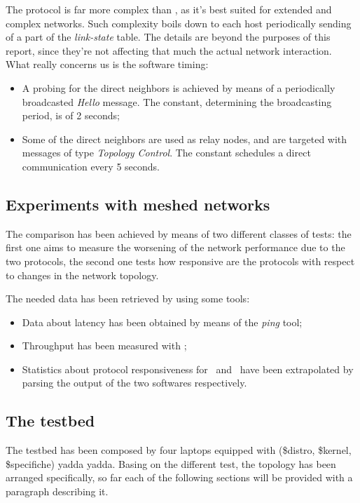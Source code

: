     The protocol is far more complex than \batman, as it's best suited for
    extended and complex networks. Such complexity boils down to
    each host periodically sending of a part of the \emph{link-state}
    table. The details are beyond the purposes of this report, since
    they're not affecting that much the actual network interaction. What
    really concerns us is the software timing:
    \begin{itemize}
    \item   A probing for the direct neighbors is achieved by means of a
            periodically broadcasted \emph{Hello} message. The
             constant, determining the broadcasting
            period, is of 2 seconds;
    \item   Some of the direct neighbors are used as relay nodes, and are
            targeted with messages of type \emph{Topology Control}.
            The  constant schedules a direct
            communication every 5 seconds.
    \end{itemize}

\subsection{Experiments with meshed networks}

    The comparison has been achieved by means of two different classes
    of tests: the first one aims to measure the worsening of the network
    performance due to the two protocols, the second one tests how
    responsive are the protocols with respect to changes in the
    network topology.

    The needed data has been retrieved by using some tools:
    \begin{itemize}
    \item   Data about latency has been obtained by means of the
            \emph{ping} tool;
    \item   Throughput has been measured with
            \netperf\cite{bib:NetPerf};
    \item   Statistics about protocol responsiveness for \batman\ and
            \olsr\ have been extrapolated by parsing the output of the
            two softwares respectively.
    \end{itemize}

\subsection{The testbed}

    The testbed has been composed by four laptops equipped with
    (\$distro, \$kernel, \$specifiche) yadda yadda. Basing on the
    different test, the topology has been arranged specifically, so
    far each of the following sections will be provided with a
    paragraph describing it.
